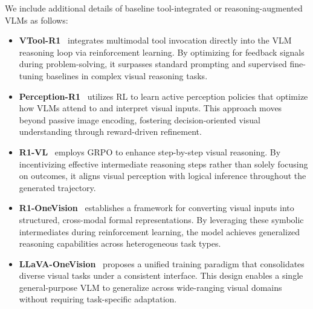 We include additional details of baseline tool-integrated or reasoning-augmented VLMs as follows:
\begin{itemize} 
    \item \textbf{VTool-R1}~\cite{wu2025vtool} integrates multimodal tool invocation directly into the VLM reasoning loop via reinforcement learning. By optimizing for feedback signals during problem-solving, it surpasses standard prompting and supervised fine-tuning baselines in complex visual reasoning tasks. 
    \item \textbf{Perception-R1}~\cite{yu2025perception} utilizes RL to learn active perception policies that optimize how VLMs attend to and interpret visual inputs. This approach moves beyond passive image encoding, fostering decision-oriented visual understanding through reward-driven refinement. 
    \item \textbf{R1-VL}~\cite{zhang2025r1} employs GRPO to enhance step-by-step visual reasoning. By incentivizing effective intermediate reasoning steps rather than solely focusing on outcomes, it aligns visual perception with logical inference throughout the generated trajectory. 
    \item \textbf{R1-OneVision}~\cite{yang2025r1} establishes a framework for converting visual inputs into structured, cross-modal formal representations. By leveraging these symbolic intermediates during reinforcement learning, the model achieves generalized reasoning capabilities across heterogeneous task types. 
    \item \textbf{LLaVA-OneVision}~\cite{an2025llava} proposes a unified training paradigm that consolidates diverse visual tasks under a consistent interface. This design enables a single general-purpose VLM to generalize across wide-ranging visual domains without requiring task-specific adaptation.
\end{itemize}